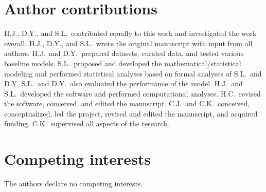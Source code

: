 \documentclass[pdflatex,sn-nature]{sn-jnl}
\begin{document}
\section*{Author contributions}
H.J., D.Y., and S.L.\ contributed equally to this work and investigated the work overall. H.J., D.Y., and S.L.\ wrote the original manuscript with input from all authors. H.J.\ and D.Y.\ prepared datasets, curated data, and tested various baseline models. S.L.\ proposed and developed the mathematical/statistical modeling and performed statistical analyses based on formal analyses of S.L.\ and D.Y. S.L.\ and D.Y.\ also evaluated the performance of the model. H.J.\ and S.L.\ developed the software and performed computational analyses. H.C.\ revised the software, conceived, and edited the manuscript. C.J.\ and C.K.\ conceived, conceptualized, led the project, revised and edited the manuscript, and acquired funding. C.K.\ supervised all aspects of the research.

\section*{Competing interests}
The authors declare no competing interests.



\end{document}
